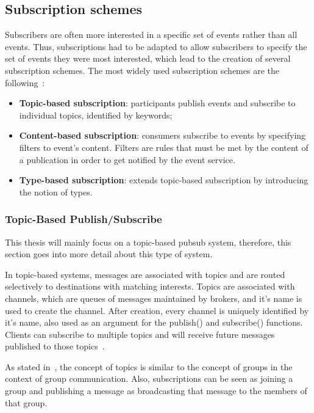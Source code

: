 \subsection{Subscription schemes}
\label{sec:subscription_model}

Subscribers are often more interested in a specific set of events rather than all events. Thus, subscriptions had to be adapted to allow subscribers to specify the set of events they were most interested, which lead to the creation of several subscription schemes. The most widely used subscription schemes are the following~\cite{faces-of-pub-sub}:

\begin{itemize}
    \item \textbf{Topic-based subscription}: participants publish events and subscribe to individual topics, identified by keywords;
    \item \textbf{Content-based subscription}: consumers subscribe to events by specifying filters to event's content. Filters are rules that must be met by the content of a publication in order to get notified by the event service.
    \item \textbf{Type-based subscription}: extends topic-based subscription by introducing the notion of types.
\end{itemize}

\subsubsection{Topic-Based Publish/Subscribe}
\label{sec:topic-based-poubsub}

This thesis will mainly focus on a topic-based \gls{pubsub} system, therefore, this section goes into more detail about this type of system.

In topic-based systems, messages are associated with topics and are routed selectively to destinations with matching interests. Topics are associated with channels, which are queues of messages maintained by brokers, and it’s name is used to create the channel. After creation, every channel is uniquely identified by it’s name, also used as an argument for the publish() and subscribe() functions. Clients can subscribe to multiple topics and will receive future messages published to those topics~\cite{pubsub-systems-book}.

As stated in~\cite{faces-of-pub-sub}, the concept of topics is similar to the concept of groups in the context of group communication. Also, subscriptions can be seen as joining a group and publishing a message as broadcasting that message to the members of that group.

